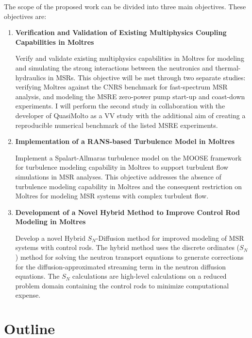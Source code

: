 The scope of the proposed work can be divided into three main objectives. These objectives are:
%
\begin{enumerate}[itemindent=20pt, listparindent=1.5em, label=\textbf{\arabic*}]
  \item \textbf{Verification and Validation of Existing Multiphysics Coupling Capabilities in
    Moltres}

    Verify and validate existing multiphysics capabilities in Moltres for modeling and simulating
    the strong interactions between the neutronics and thermal-hydraulics in \glspl{MSR}. This
    objective will be met through two separate studies: verifying Moltres against the CNRS
    benchmark \cite{tiberga_results_2020} for fast-spectrum \gls{MSR} analysis, and modeling the
    \gls{MSRE} zero-power pump start-up and coast-down experiments. I will perform the second study
    in collaboration with the developer of QuasiMolto \cite{reynolds_analysis_2023} as a \gls{VV}
    study with the additional aim of creating a reproducible numerical benchmark of the listed
    \gls{MSRE} experiments.

  \item \textbf{Implementation of a \gls{RANS}-based Turbulence Model in Moltres}

    Implement a Spalart-Allmaras turbulence model on the \gls{MOOSE} framework for
    turbulence modeling capability in Moltres to support turbulent flow simulations in \gls{MSR}
    analyses. This objective addresses the absence of turbulence modeling capability in
    Moltres and the consequent restriction on Moltres for modeling \gls{MSR} systems with complex
    turbulent flow.

  \item \textbf{Development of a Novel Hybrid Method to Improve Control Rod Modeling in Moltres}

    Develop a novel Hybrid $S_N$-Diffusion method for improved modeling of \gls{MSR} systems with
    control rods. The hybrid method uses the discrete ordinates ($S_N$) method for solving the
    neutron transport equations to generate corrections for the diffusion-approximated streaming
    term in the neutron diffusion equations. The $S_N$ calculations are high-level
    calculations on a reduced problem domain containing the control rods to minimize computational
    expense.
\end{enumerate}

\section{Outline}

